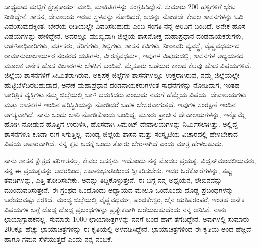 ಸಾಧ್ಯವಾದ ಮಟ್ಟಿಗೆ ಕ್ಷೇತ್ರಕಾರ್ಯ ಮಾಡಿ, ಮಾಹಿತಿಗಳನ್ನು ಸಂಗ್ರಹಿಸಿದ್ದೇನೆ. ಸುಮಾರು 200 ಹಳ್ಳಿಗಳಿಗೆ ಭೇಟಿ ನೀಡಿದ್ದೇನೆ. ಶಾಸನ, ದೇವಾಲಯ ಇರುವ ಸ್ಥಳವನ್ನು ನೋಡಿದರೆ, ಅದನ್ನು ನೋಡದೇ ಕೇವಲ ಶಾಸನಗಳನ್ನು ಓದಿ ವಿವರಿಸುವುದಕ್ಕಿಂತ, ಬೇರೆಯ ರೀತಿಯಲ್ಲೇ ವಿವರಿಸಬಹುದು ಎಂಬ ಸಂಗತಿ ನನ್ನ ಅರಿವಿಗೆ ಬಂದಿದೆ. ಅನೇಕ ಹೊಸ ವಿಷಯಗಳನ್ನು ಹೇಳಿದ್ದೇನೆ. ಅದರಲ್ಲೂ ಮುಖ್ಯವಾಗಿ ಜಿಲ್ಲೆಯ ಶಾಸನೋಕ್ತ ಮಹಾಪ್ರಧಾನ ದಂಡನಾಯಕರುಗಳು, ಆಡಳಿತಾಧಿಕಾರಿಗಳು, ವರ್ತಕರು, ತೆರಿಗೆಗಳು, ಶಿಲ್ಪಿಗಳು, ಶಾಸನ ಕವಿಗಳು, ನೀರಾವರಿ ವ್ಯವಸ್ಥೆ, ವೈಷ್ಣವಧರ್ಮದ ರಾಮಾನುಜಾಚಾರ್ಯರ ನಂತರದ ಯತಿಗಳು, ವೀರಶೈವಧರ್ಮ, ಇವುಗಳ ವಿಷಯದಲ್ಲಿ, ಶಾಸನಗಳ ಅಧ್ಯಯನದ ಮೂಲಕ ಅನೇಕ ಹೊಸ ವಿಚಾರಗಳು ಬೆಳಕಿಗೆ ಬಂದಿವೆ. ಮೈಸೂರು ಒಡೆಯರ ಕಾಲದ ಕೆಲವು ಹೊಸ ವಿಷಯಗಳಿವೆ. ಜಿಲ್ಲೆಯ ಶಾಸನಗಳಿಗೆ ಸೀಮಿತರಾಗಿರುವ, ಅಕ್ಕಪಕ್ಕ ಜಿಲ್ಲೆಗಳ ಶಾಸನಗಳಲ್ಲೂ ಉಕ್ತರಾಗಿರುವ, ನಮ್ಮ ಜಿಲ್ಲೆಯಲ್ಲೇ ಹುಟ್ಟಿಬೆಳೆದಿರಬಹುದಾದ, ಅನೇಕ ಮಹಾಪ್ರಧಾನ ದಂಡನಾಯಕರುಗಳಂತ ಸಾಧನೆಗಳನ್ನು ನೋಡಿದಾಗ, ಇಂತಹ ಚಾರಿತ್ರಿಕ ವ್ಯಕ್ತಿಗಳು ನಮ್ಮ ಜಿಲ್ಲೆಯಲ್ಲಿ ಬಾಳಿ ಬದುಕಿದರು ಎಂಬುದು ನಮಗೆ ಹೆಮ್ಮೆಯ ವಿಷಯ. ದೇವಾಲಯಗಳು ಮತ್ತು ಶಾಸನಗಳ ಇಂದಿನ ಪರಿಸ್ಥಿತಿಯನ್ನು ನೋಡಿದರೆ ಬಹಳ ಬೇಸರವಾಗುತ್ತದೆ. ಇವುಗಳ ಸಂರಕ್ಷಣೆ ಇಂದಿನ ಅಗತ್ಯವಾಗಿದೆ. ನಾನು ಒಂದು ಬಾರಿ ನೋಡಿಕೊಂಡು ಬಂದಿದ್ದ, ಮೂರು ಪ್ರಾಚೀನ ದೇವಾಲಯಗಳನ್ನು, ಇನ್ನೊಮ್ಮೆ ಹೋಗಿ ನೋಡುವ ಹೊತ್ತಿಗೆ ಉರುಳಿಸಿ, ಹೊಸದಾಗಿ ಸಿಮೆಂಟ್​ ದೇವಾಲಯಗಳನ್ನು ನಿರ್ಮಿಸಲಾಗಿತ್ತು. ಅಲ್ಲಿದ್ದ ಶಾಸನಗಳೂ ಕೂಡಾ ಈಗ ಸಿಗುತ್ತಿಲ್ಲ. ಮಂಡ್ಯ ಜಿಲ್ಲೆಯ ಶಾಸನ ಮತ್ತು ಸಂಸ್ಕೃಟಿಯ ವಿಚಾರದಲ್ಲಿ ಹೇಳಬೇಕಾದ ವಿಷಯ ಅಪಾರವಾಗಿದೆ. ನನ್ನ ಕೃಟಿ ಅದಕ್ಕೆ ಒಂದು ತೋರು ಬೇರಳಾಗಿದೆ ಎಂದು ಮಾತ್ರ ಹೇಳಬಹುದು.

ನಾನು ಶಾಸನ ಕ್ಷೇತ್ರದ ಪರಿಣತನಲ್ಲ. ಕೇವಲ ಆಸಕ್ತನು. ಇದೊಂದು ನನ್ನ ಮೊದಲ ಪ್ರಯತ್ನ. ವಿದ್ವನ್​ ಮಂಡಲಿಯವರು, ನನ್ನ ಈ ಪ್ರಯತ್ನವನ್ನು ಆದರದಿಂದ, ಸಹಾನುಭೂತಿಯಿಂದ ಸ್ವೀಕರಿಸಬೇಕು. ಇದರ ಓರೆಕೋರೆಗಳನ್ನು, ತಪ್ಪು ತವಡಿಗಳನ್ನು, ಎತ್ತಿ ತೋರಿಸಬೇಕು. ಅದನ್ನು ತಿದ್ದಿಕೊಳ್ಳುತ್ತೇನೆ. ಈ ಬಗ್ಗೆ ನನ್ನ ಅಧ್ಯಯನ, ಲೇಖನವನ್ನು ಮುಂದುವರಿಸುತ್ತೇನೆ. ಈ ಗ್ರಂಥದ ಒಂದೊಂದು ಅಧ್ಯಾಯದ ಮೇಲೂ ಒಂದೊಂದು ದೊಡ್ಡ ಪ್ರಬಂಧಗಳನ್ನು ಬರೆಯುವಷ್ಟು ಸರಕಿದೆ. ಮಂಡ್ಯ ಜಿಲ್ಲೆಯಲ್ಲಿ ವೈಷ್ಣವಧರ್ಮ, ಪಂಚಿಕೇಶ್ವರ, ಜೈನ ಯತಿಪರಂಪರೆ, ಇಂತಹ ಅನೇಕ ವಿಷಯಗಳ ಬಗ್ಗೆ ದೊಡ್ಡ ದೊಡ್ಡ ಪ್ರಬಂಧಗಳನ್ನು ಪ್ರತ್ಯೇಕವಾಗಿ ಬರೆಯಬಹುದೆಂದು ನನ್ನ ಅನಿಸಿಕೆ. ನಾನು ಛಾಯಾಗ್ರಾಹಕನಲ್ಲ. ಸುಮಾರು 1000 ಛಾಯಾಚಿತ್ರಗಳನ್ನು ನನಗೆ ಬಂದ ಹಾಗೆ ತೆಗೆದಿದ್ದೇನೆ. ಅವುಗಳಲ್ಲಿ ಸುಮಾರು 200ಕ್ಕೂ ಹೆಚ್ಚು ಛಾಯಾಚಿತ್ರಗಳನ್ನು ಈ ಕೃತಿಯಲ್ಲಿ ಅಳವಡಿಸಿದ್ದೇನೆ. ಛಾಯಾಚಿತ್ರಗಳಿಂದ ಈ ಕೃತಿಯ ಅಂದ ಹೆಚ್ಚಿದೆ ಹಾಗೂ ಗಮನ ಸೆಳೆಯುತ್ತದೆ ಎಂದು ನನ್ನ ನಂಬಿಕೆ.

